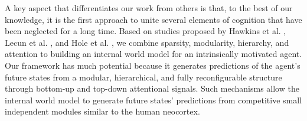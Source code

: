 A key aspect that differentiates our work from others is that, to the best of our knowledge, it is the first approach to unite several elements of cognition that have been neglected for a long time. Based on studies proposed by Hawkins et al. \cite{hawkins_why_2017}, Lecun et al. \cite{lecun2022path}, and Hole et al. \cite{hole2021thousand}, we combine sparsity, modularity, hierarchy, and attention to building an internal world model for an intrinsically motivated agent. Our framework has much potential because it generates predictions of the agent's future states from a modular, hierarchical, and fully reconfigurable structure through bottom-up and top-down attentional signals. Such mechanisms allow the internal world model to generate future states' predictions from competitive small independent modules similar to the human neocortex.









